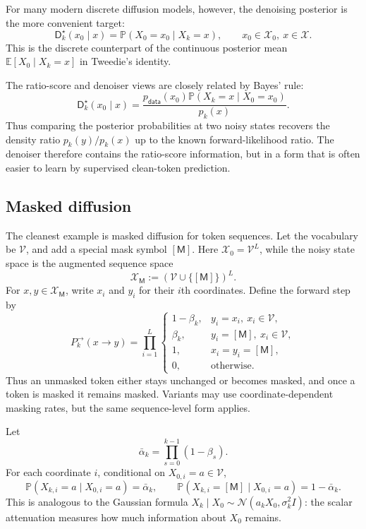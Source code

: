 \documentclass[10pt,a4paper]{amsart}
\numberwithin{equation}{section}
\newcommand{\E}{\mathbb{E}}
\newcommand{\Pp}{\mathbb{P}}
\newcommand{\Id}{I}
\newcommand{\cX}{\mathcal{X}}
\newcommand{\mc}[1]{\mathcal{#1}}
\newcommand{\pdata}{p_{\mathsf{data}}}
\newcommand{\dstar}{\mathsf{D}^{\star}}
\newcommand{\normal}[2]{\mathcal{N}\!\left(#1,#2\right)}
\begin{document}
For many modern discrete diffusion models, however, the denoising posterior is
the more convenient target:
\[
    \dstar_k(x_0\mid x)=\Pp(X_0=x_0\mid X_k=x),
    \qquad x_0\in\cX_0,\ x\in\cX.
\]
This is the discrete counterpart of the continuous posterior mean
$\E[X_0\mid X_k=x]$ in Tweedie's identity.

The ratio-score and denoiser views are closely related by Bayes' rule:
\[
    \dstar_k(x_0\mid x)
    =
    \frac{\pdata(x_0)\Pp(X_k=x\mid X_0=x_0)}{p_k(x)}.
\]
Thus comparing the posterior probabilities at two noisy states recovers the
density ratio $p_k(y)/p_k(x)$ up to the known forward-likelihood ratio.  The
denoiser therefore contains the ratio-score information, but in a form that is
often easier to learn by supervised clean-token prediction.

\subsection{Masked diffusion}

The cleanest example is masked diffusion for token sequences.  Let the
vocabulary be $\mc{V}$, and add a special mask symbol $[\mathsf M]$.
Here $\cX_0=\mc{V}^L$, while the noisy state space is the augmented
sequence space
\[
    \cX_{\mathsf M}:=(\mc{V}\cup\{[\mathsf M]\})^L.
\]
For $x,y\in\cX_{\mathsf M}$, write $x_i$ and $y_i$ for their $i$th
coordinates.  Define the forward step by
\begin{equation}\label{eq:mask-forward}
    P_k^{\to}(x\to y)
    =
    \prod_{i=1}^L
    \begin{cases}
    1-\beta_k, & y_i=x_i,\ x_i\in\mc{V},\\
    \beta_k, & y_i=[\mathsf M],\ x_i\in\mc{V},\\
    1, & x_i=y_i=[\mathsf M],\\
    0, & \text{otherwise}.
    \end{cases}
\end{equation}
Thus an unmasked token either stays unchanged or becomes masked, and once a
token is masked it remains masked.  Variants may use coordinate-dependent
masking rates, but the same sequence-level form applies.

Let
\[
    \bar\alpha_k=\prod_{s=0}^{k-1}(1-\beta_s).
\]
For each coordinate $i$, conditional on $X_{0,i}=a\in\mc{V}$,
\[
    \Pp(X_{k,i}=a\mid X_{0,i}=a)=\bar\alpha_k,\qquad
    \Pp(X_{k,i}=[\mathsf M]\mid X_{0,i}=a)=1-\bar\alpha_k.
\]
This is analogous to the Gaussian formula
$X_k\mid X_0\sim\normal{a_kX_0}{\sigma_k^2\Id}$: the scalar attenuation
measures how much information about $X_0$ remains.
\end{document}
